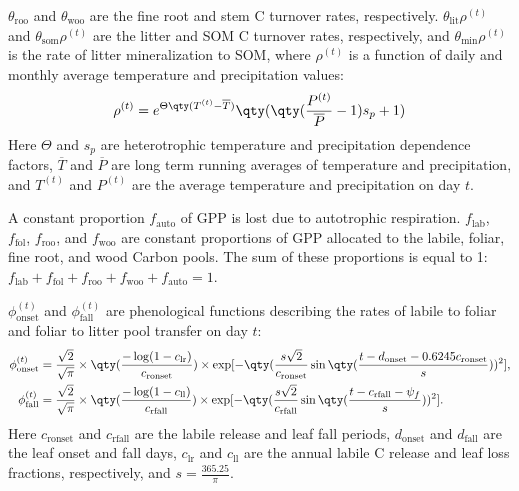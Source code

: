 \documentclass{article}
\begin{document}
			$\theta_\text{roo}$ and $\theta_\text{woo}$ are the fine root and stem C turnover rates, respectively.  $\theta_\text{lit} \rho^{(t)}$ and $\theta_\text{som} \rho^{(t)}$ are the litter and SOM C turnover rates, respectively, and $\theta_\text{min} \rho^{(t)}$ is the rate of litter mineralization to SOM, where $\rho^{(t)}$ is a function of daily and monthly average temperature and precipitation values:
			\begin{align}
				\rho^{(t)} = e^{\Theta\qty(T^{(t)} - \overline{T})}\qty(\qty(\frac{P^{(t)}}{\overline{P}}-1)s_p+1)
			\end{align}
			Here $\Theta$ and $s_p$ are heterotrophic temperature and precipitation dependence factors, $\overline{T}$ and $\overline{P}$ are long term running averages of temperature and precipitation, and $T^{(t)}$ and $P^{(t)}$ are the average temperature and precipitation on day $t$.

			A constant proportion $f_\text{auto}$ of GPP is lost due to autotrophic respiration.  $f_\text{lab}$, $f_\text{fol}$, $f_\text{roo}$, and $f_\text{woo}$ are constant proportions of GPP allocated to the labile, foliar, fine root, and wood Carbon pools.  The sum of these proportions is equal to 1: $f_\text{lab} + f_\text{fol} + f_\text{roo} + f_\text{woo} + f_\text{auto} = 1$.

			$\phi_\text{onset}^{(t)}$ and $\phi_\text{fall}^{(t)}$ are phenological functions describing the rates of labile to foliar and foliar to litter pool transfer on day $t$:
			\begin{align}
				\phi_\text{onset}^{(t)} &= \frac{\sqrt{2}}{\sqrt{\pi}}\times\qty(\frac{-\log(1-c_\text{lr})}{c_\text{ronset}})\times\exp[-\qty(\frac{s\sqrt{2}}{c_\text{ronset}}\sin\qty(\frac{t-d_\text{onset}-0.6245c_\text{ronset}}{s}))^2],\\
				\phi_\text{fall}^{(t)} &= \frac{\sqrt{2}}{\sqrt{\pi}}\times\qty(\frac{-\log(1-c_\text{ll})}{c_\text{rfall}})\times\exp[-\qty(\frac{s\sqrt{2}}{c_\text{rfall}}\sin\qty(\frac{t - c_\text{rfall} - \psi_f}{s}))^2].
			\end{align}
			Here $c_\text{ronset}$ and $c_\text{rfall}$ are the labile release and leaf fall periods, $d_\text{onset}$ and $d_\text{fall}$ are the leaf onset and fall days, $c_\text{lr}$ and $c_\text{ll}$ are the annual labile C release and leaf loss fractions, respectively, and $s = \frac{365.25}{\pi}$.
\end{document}
